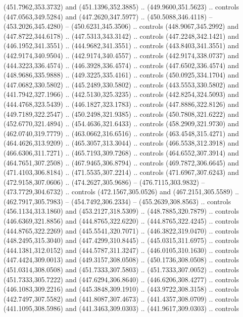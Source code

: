 \begin{scope}[cm={{1.25,0.0,0.0,-1.25,(0.0,743.43331)}}]
    (451.7962,353.3732) and (451.1396,352.3885) .. (449.9600,351.5623) .. controls
    (447.0563,349.5284) and (447.2620,347.5977) .. (450.5088,346.4118) --
    (453.2026,345.4280) -- (450.6231,345.3506) .. controls (448.9067,345.2992) and
    (447.8722,344.6178) .. (447.5313,343.3142) .. controls (447.2248,342.1421) and
    (446.1952,341.3551) .. (444.9682,341.3551) .. controls (443.8403,341.3551) and
    (442.9174,340.9504) .. (442.9174,340.4557) .. controls (442.9174,338.0737) and
    (444.3223,336.4574) .. (446.3928,336.4574) .. controls (447.6502,336.4574) and
    (448.9686,335.9888) .. (449.3225,335.4161) .. controls (450.0925,334.1704) and
    (447.0682,330.5802) .. (445.2489,330.5802) .. controls (443.5553,330.5802) and
    (441.7942,327.1966) .. (442.5130,325.3235) .. controls (442.8254,324.5093) and
    (444.4768,323.5439) .. (446.1827,323.1783) .. controls (447.8886,322.8126) and
    (449.7189,322.2547) .. (450.2498,321.9385) .. controls (450.7808,321.6222) and
    (452.6770,321.4894) .. (454.4636,321.6433) .. controls (458.2909,321.9730) and
    (462.0740,319.7779) .. (463.0662,316.6516) .. controls (463.4548,315.4271) and
    (464.4626,313.9209) .. (465.3057,313.3044) .. controls (466.5538,312.3918) and
    (466.6306,311.7271) .. (465.7193,309.7268) .. controls (464.6552,307.3914) and
    (464.7651,307.2508) .. (467.9465,306.8794) .. controls (469.7872,306.6645) and
    (471.4103,306.8184) .. (471.5535,307.2214) .. controls (471.6967,307.6243) and
    (472.9158,307.0606) .. (474.2627,305.9686) -- (476.7115,303.9832) --
    (473.7729,304.6732) .. controls (472.1567,305.0526) and (467.2151,305.5589) ..
    (462.7917,305.7983) -- (454.7492,306.2334) -- (455.2639,308.8563) .. controls
    (456.1134,313.1860) and (453.2127,318.5309) .. (448.7885,320.7879) .. controls
    (446.6369,321.8856) and (444.8765,322.6220) .. (444.8765,322.4245) .. controls
    (444.8765,322.2269) and (445.5541,320.7071) .. (446.3822,319.0470) .. controls
    (448.2495,315.3040) and (447.4299,310.8445) .. (445.0315,311.6975) .. controls
    (444.1381,312.0152) and (444.5787,311.3247) .. (446.0105,310.1630) .. controls
    (447.4424,309.0013) and (449.3157,308.0508) .. (450.1736,308.0508) .. controls
    (451.0314,308.0508) and (451.7333,307.5803) .. (451.7333,307.0052) .. controls
    (451.7333,305.7222) and (447.6294,306.8640) .. (446.6206,308.4277) .. controls
    (446.1083,309.2216) and (445.3848,309.1910) .. (443.9722,308.3158) .. controls
    (442.7497,307.5582) and (441.8087,307.4673) .. (441.4357,308.0709) .. controls
    (441.1095,308.5986) and (441.3463,309.0303) .. (441.9617,309.0303) .. controls

\end{scope}
